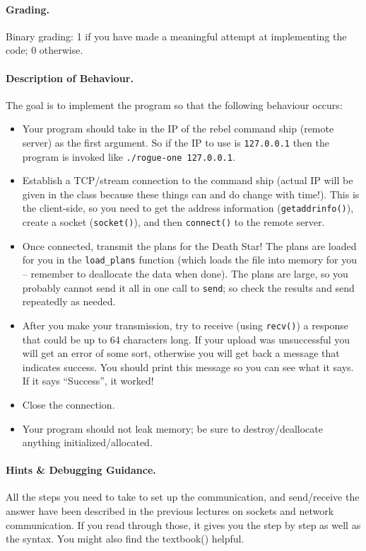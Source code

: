 \paragraph{Grading.} Binary grading: 1 if you have made a meaningful attempt at implementing the code; 0 otherwise.

\paragraph{Description of Behaviour.} The goal is to implement the program so that the following behaviour occurs:

\begin{itemize}
	\item Your program should take in the IP of the rebel command ship (remote server) as the first argument. So if the IP to use is \texttt{127.0.0.1} then the program is invoked like \texttt{./rogue-one 127.0.0.1}.
	\item Establish a TCP/stream connection to the command ship (actual IP will be given in the class because these things can and do change with time!). This is the client-side, so you need to get the address information (\texttt{getaddrinfo()}), create a socket (\texttt{socket()}), and then \texttt{connect()} to the remote server.
	\item Once connected, transmit the plans for the Death Star! The plans are loaded for you in the \texttt{load\_plans} function (which loads the file into memory for you -- remember to deallocate the data when done). The plans are large, so you probably cannot send it all in one call to \texttt{send}; so check the results and send repeatedly as needed.
	\item After you make your transmission, try to receive (using \texttt{recv()}) a response that could be up to 64 characters long. If your upload was unsuccessful you will get an error of some sort, otherwise you will get back a message that indicates success. You should print this message so you can see what it says. If it says ``Success'', it worked!
	\item Close the connection.
	\item Your program should not leak memory; be sure to destroy/deallocate anything initialized/allocated.
\end{itemize}


\paragraph{Hints \& Debugging Guidance.}
All the steps you need to take to set up the communication, and send/receive the answer have been described in the previous lectures on sockets and network communication. If you read through those, it gives you the step by step as well as the syntax. You might also find the textbook(\cite{apunix}) helpful.

